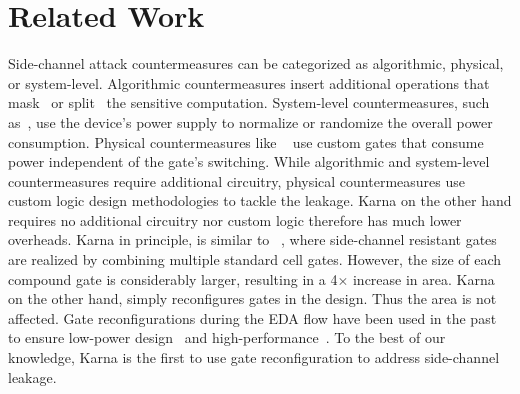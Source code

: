 \section{Related Work}
\label{sec:related}




Side-channel attack countermeasures can be categorized as algorithmic, physical, or system-level. Algorithmic countermeasures insert additional operations that mask~\cite{akkar:2001} or split~\cite{Bilgin:2014} the sensitive computation. System-level countermeasures, such as~\cite{Wang:2013,tokunaga:2009,singh:2015,mathew:2018}, use the device's power supply to  normalize or randomize the overall power consumption. Physical countermeasures like ~\cite{Kim2017,Tiri:2004} use custom gates that consume power independent of the gate's switching. While  algorithmic and system-level countermeasures require additional circuitry, {physical countermeasures} use custom logic design methodologies to tackle the leakage. {\sf Karna} on the other hand requires no additional circuitry nor custom logic therefore has much lower overheads.  
{\sf Karna} in principle, is similar to ~\cite{Tiri:2004}, where side-channel resistant gates are realized by combining multiple standard cell gates. However, the size of each compound gate is considerably larger, resulting in a 4$\times$ increase in area. {\sf Karna} on the other hand, simply reconfigures gates in the design. Thus the area is not affected. Gate reconfigurations during the EDA flow have been used in the past to ensure low-power design~\cite{hu:12,flach:2014} and high-performance~\cite{ozdal:2012}. To the best of our knowledge, {\sf Karna} is the first to use gate reconfiguration to address side-channel leakage.

